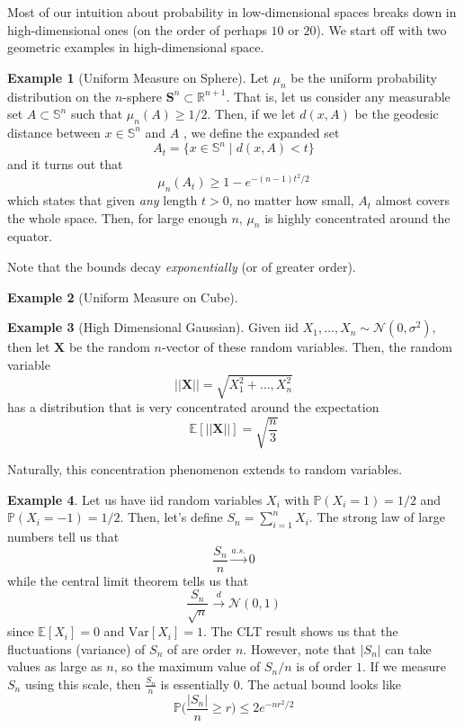 \documentclass{article}
\theoremstyle{definition}
\newtheorem{example}{Example}[section]
\theoremstyle{remark}
\theoremstyle{definition}
\begin{document}
  Most of our intuition about probability in low-dimensional spaces breaks down in high-dimensional ones (on the order of perhaps $10$ or $20$). We start off with two geometric examples in high-dimensional space. 

  \begin{example}[Uniform Measure on Sphere]
  Let $\mu_n$ be the uniform probability distribution on the $n$-sphere $\mathbf{S}^{n} \subset \mathbb{R}^{n+1}$. That is, let us consider any measurable set $A \subset \mathbb{S}^{n}$ such that $\mu_n (A) \geq 1/2$. Then, if we let $d(x, A)$ be the geodesic distance between $x \in \mathbb{S}^n$ and $A$ , we define the expanded set 
  \[A_t = \{x \in \mathbb{S}^n \mid d(x, A) < t\}\]
  and it turns out that 
  \[\mu_n (A_t) \geq 1 - e^{- (n -1) t^2 / 2}\]
  which states that given \textit{any} length $t > 0$, no matter how small, $A_t$ almost covers the whole space. Then, for large enough $n$, $\mu_n$ is highly concentrated around the equator. 
  \end{example}

  Note that the bounds decay \textit{exponentially} (or of greater order). 

  \begin{example}[Uniform Measure on Cube]

  \end{example}

  \begin{example}[High Dimensional Gaussian]
  Given iid $X_1, \ldots, X_n \sim \mathcal{N}(0, \sigma^2)$, then let $\mathbf{X}$ be the random $n$-vector of these random variables. Then, the random variable 
  \[||\mathbf{X}|| = \sqrt{X_1^2 + \ldots, X_n^2}\]
  has a distribution that is very concentrated around the expectation 
  \[\mathbb{E}[||\mathbf{X}||] = \sqrt{\frac{n}{3}}\]
  \end{example}

  Naturally, this concentration phenomenon extends to random variables. 

  \begin{example}
  Let us have iid random variables $X_i$ with $\mathbb{P}(X_i = 1) = 1/2$ and $\mathbb{P}(X_i = -1) = 1/2$. Then, let's define $S_n = \sum_{i=1}^n X_i$. The strong law of large numbers tell us that 
  \[\frac{S_n}{n} \xrightarrow{a.s.} 0\]
  while the central limit theorem tells us that 
  \[\frac{S_n}{\sqrt{n}} \xrightarrow{d} \mathcal{N}(0, 1)\]
  since $\mathbb{E}[X_i] = 0$ and $\mathrm{Var}[X_i] = 1$. The CLT result shows us that the fluctuations (variance) of $S_n$ of are order $n$. However, note that $|S_n|$ can take values as large as $n$, so the maximum value of $S_n / n$ is of order $1$. If we measure $S_n$ using this scale, then $\frac{S_n}{n}$ is essentially $0$. The actual bound looks like 
  \[\mathbb{P} \bigg( \frac{|S_n|}{n} \geq r \bigg) \leq 2 e^{-n r^2 / 2}\]
  \end{example}
\end{document}
